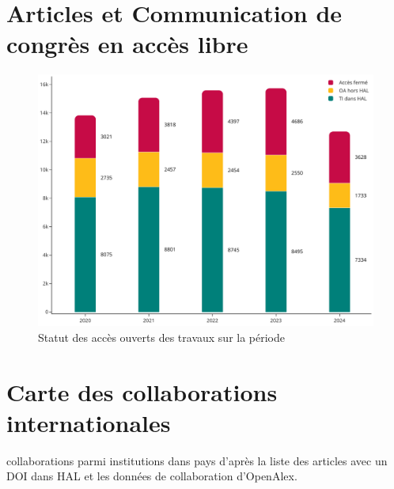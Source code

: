 \documentclass[french, 11pt]{dibiso/biso}
\begin{document}

\pagebreak

\section{Articles et Communication de congrès en accès libre} %

\begin{figure}[!h]
  \includegraphics[width=\textwidth]{figures/open_access_works.pdf}
  \caption{Statut des accès ouverts des travaux sur la période \oaworksperiod}
  \label{fig_open_access_works}
\end{figure}







\pagebreak

\section{Carte des collaborations internationales}

{\collaborationsnb} collaborations parmi {\institutionsnb} institutions dans {\countriesnb} pays d'après la liste des articles avec un DOI dans HAL et les données de collaboration d'OpenAlex.
\end{document}
